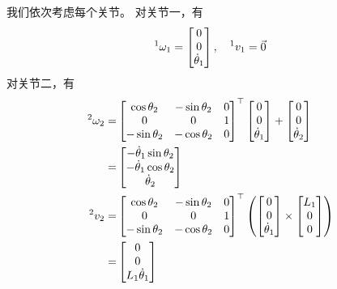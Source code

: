 \documentclass{ctexart}
\begin{document}
我们依次考虑每个关节。
对关节一，有
\[
    \prescript{1}{}{\omega_1} = \begin{bmatrix}
        0 \\ 0 \\ \dot \theta_1
    \end{bmatrix}, \quad
    \prescript{1}{}{v_1} = \vec 0
\]
对关节二，有
\[
    \begin{aligned}
    \prescript{2}{}{\omega_2} = & 
    \begin{bmatrix}
        \cos \theta_2 & - \sin \theta_2 & 0  \\
        0 & 0 & 1 \\
        -\sin \theta_2 & - \cos \theta_2 & 0
    \end{bmatrix}^\top 
    \begin{bmatrix}
        0 \\ 0 \\ \dot \theta_1
    \end{bmatrix} +
    \begin{bmatrix}
        0 \\ 0 \\ \dot \theta_2
    \end{bmatrix} \\
    = & \begin{bmatrix}
        -\dot \theta_1 \sin\theta_2 \\
        -\dot \theta_1 \cos\theta_2 \\
        \dot \theta_2
    \end{bmatrix} \\
    \prescript{2}{}{v_2} = &
    \begin{bmatrix}
        \cos \theta_2 & - \sin \theta_2 & 0  \\
        0 & 0 & 1 \\
        -\sin \theta_2 & - \cos \theta_2 & 0
    \end{bmatrix}^\top 
    \left(
        \begin{bmatrix}
            0 \\ 0 \\ \dot \theta_1
        \end{bmatrix}
        \times
        \begin{bmatrix}
           L_1 \\ 0 \\ 0 
        \end{bmatrix}
    \right) \\ = & \begin{bmatrix}
        0 \\ 0 \\ L_1 \dot\theta_1
    \end{bmatrix}
    \end{aligned}
\]
\end{document}
